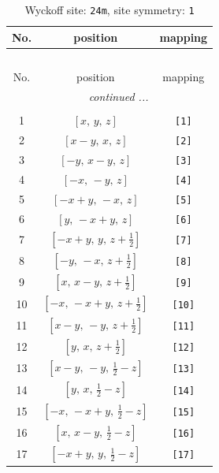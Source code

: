 \documentclass[fleqn,8pt]{jsarticle}
\begin{document}
\begin{longtable}{ccc}
\caption{Wyckoff site: {\tt 24m}, site symmetry: {\tt 1}}
 \\
 \hline \hline
No. & position & mapping \\ \hline \endfirsthead

\multicolumn{2}{l}{\tablename\ \thetable{}} \\
 \hline \hline
No. & position & mapping \\ \hline \endhead

 \hline \hline
\multicolumn{2}{r}{\footnotesize\it continued ...} \\ \endfoot

 \hline \hline
\multicolumn{2}{r}{} \\ \endlastfoot

1 & $\left[ x,\, y,\, z \right]$ & {\tt [1]} \\ \hline
2 & $\left[ x - y,\, x,\, z \right]$ & {\tt [2]} \\ \hline
3 & $\left[ - y,\, x - y,\, z \right]$ & {\tt [3]} \\ \hline
4 & $\left[ - x,\, - y,\, z \right]$ & {\tt [4]} \\ \hline
5 & $\left[ - x + y,\, - x,\, z \right]$ & {\tt [5]} \\ \hline
6 & $\left[ y,\, - x + y,\, z \right]$ & {\tt [6]} \\ \hline
7 & $\left[ - x + y,\, y,\, z + \frac{1}{2} \right]$ & {\tt [7]} \\ \hline
8 & $\left[ - y,\, - x,\, z + \frac{1}{2} \right]$ & {\tt [8]} \\ \hline
9 & $\left[ x,\, x - y,\, z + \frac{1}{2} \right]$ & {\tt [9]} \\ \hline
10 & $\left[ - x,\, - x + y,\, z + \frac{1}{2} \right]$ & {\tt [10]} \\ \hline
11 & $\left[ x - y,\, - y,\, z + \frac{1}{2} \right]$ & {\tt [11]} \\ \hline
12 & $\left[ y,\, x,\, z + \frac{1}{2} \right]$ & {\tt [12]} \\ \hline
13 & $\left[ x - y,\, - y,\, \frac{1}{2} - z \right]$ & {\tt [13]} \\ \hline
14 & $\left[ y,\, x,\, \frac{1}{2} - z \right]$ & {\tt [14]} \\ \hline
15 & $\left[ - x,\, - x + y,\, \frac{1}{2} - z \right]$ & {\tt [15]} \\ \hline
16 & $\left[ x,\, x - y,\, \frac{1}{2} - z \right]$ & {\tt [16]} \\ \hline
17 & $\left[ - x + y,\, y,\, \frac{1}{2} - z \right]$ & {\tt [17]} \\ \hline

\end{longtable}
\end{document}
